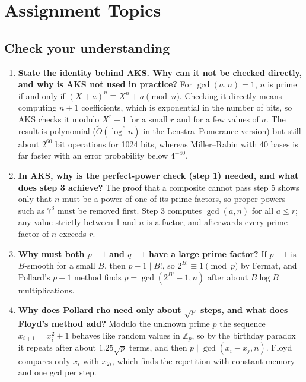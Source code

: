 \section{Assignment Topics}\label{q:assign}

\subsection*{Check your understanding}
\begin{enumerate}[leftmargin=1.6em,itemsep=3pt]
  \item \textbf{State the identity behind AKS. Why can it not be checked directly, and why is AKS not used in practice?} For $\gcd(a, n) = 1$, $n$ is prime if and only if $(X + a)^n \equiv X^n + a \pmod n$. Checking it directly means computing $n + 1$ coefficients, which is exponential in the number of bits, so AKS checks it modulo $X^r - 1$ for a small $r$ and for a few values of $a$. The result is polynomial ($\tilde O(\log^6 n)$ in the Lenstra--Pomerance version) but still about $2^{60}$ bit operations for 1024 bits, whereas Miller--Rabin with 40 bases is far faster with an error probability below $4^{-40}$.
  \item \textbf{In AKS, why is the perfect-power check (step 1) needed, and what does step 3 achieve?} The proof that a composite cannot pass step 5 shows only that $n$ must be a power of one of its prime factors, so proper powers such as $7^3$ must be removed first. Step 3 computes $\gcd(a, n)$ for all $a \le r$; any value strictly between 1 and $n$ is a factor, and afterwards every prime factor of $n$ exceeds $r$.
  \item \textbf{Why must both $p - 1$ and $q - 1$ have a large prime factor?} If $p - 1$ is $B$-smooth for a small $B$, then $p - 1 \mid B!$, so $2^{B!} \equiv 1 \pmod p$ by Fermat, and Pollard's $p - 1$ method finds $p = \gcd(2^{B!} - 1, n)$ after about $B \log B$ multiplications.
  \item \textbf{Why does Pollard rho need only about $\sqrt p$ steps, and what does Floyd's method add?} Modulo the unknown prime $p$ the sequence $x_{i+1} = x_i^2 + 1$ behaves like random values in $\mathbb{Z}_p$, so by the birthday paradox it repeats after about $1.25\sqrt p$ terms, and then $p \mid \gcd(x_i - x_j, n)$. Floyd compares only $x_i$ with $x_{2i}$, which finds the repetition with constant memory and one gcd per step.

\end{enumerate}
